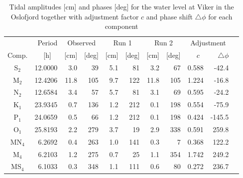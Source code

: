 \begin{table}[ht]
\caption{Tidal amplitudes [cm] and phases [deg] for the water level at Viker in the Oslofjord together with adjustment factor $c$ and phase shift $\triangle \phi$ for each component}
\label{tab:Viker}
\centering
\begin{tabular}{crrrrrrrrrr} \hline
       & Period & \multicolumn{2}{c}{Observed} & \multicolumn{2}{c}{Run 1} & \multicolumn{2}{c}{Run 2} & \multicolumn{2}{c}{Adjustment} \\
Comp.  & [h] $\;\;$ & [cm] & [deg] & [cm] & [deg] & [cm] & [deg] & $c\;\;$ & $\triangle \phi$  \\ \hline 
S$_2$  &  12.0000 &   3.0 &  39 &    5.1 &  81 &    3.2 &  67 &    0.588 &   -42.4   \\
M$_2$  &  12.4206 &  11.8 & 105 &    9.7 & 122 &   11.8 & 105 &    1.224 &   -16.8   \\
N$_2$  &  12.6584 &   3.4 &  57 &    5.7 &  81 &    3.1 &  69 &    0.595 &   -24.2   \\
K$_1$  &  23.9345 &   0.7 & 136 &    1.2 & 212 &    0.1 & 198 &    0.554 &   -75.9   \\
P$_1$  &  24.0659 &   0.5 &  66 &    1.2 & 212 &    0.1 & 198 &    0.424 &  -145.5   \\
O$_1$  &  25.8193 &   2.2 & 279 &    3.7 &  19 &    2.9 & 338 &    0.591 &   259.8   \\
MN$_4$ &   6.2692 &   0.4 & 263 &    1.0 & 141 &    0.3 &   7 &    0.368 &   122.2   \\
M$_4$  &   6.2103 &   1.2 & 275 &    0.7 &  25 &    1.1 & 354 &    1.742 &   249.2   \\
MS$_4$ &   6.1033 &   0.3 & 348 &    1.1 & 111 &    0.6 &  80 &    0.272 &   236.7   \\ \hline
\end{tabular}
\end{table}


